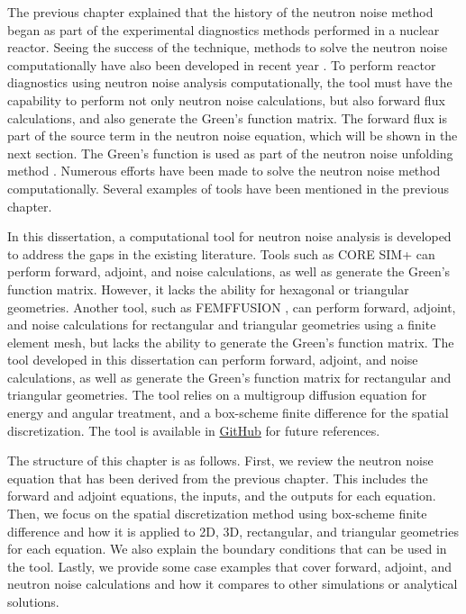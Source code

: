 \label{ch:simulations}

The previous chapter explained that the history of the neutron noise method began as part of the experimental diagnostics methods performed in a nuclear reactor. Seeing the success of the technique, methods to solve the neutron noise computationally have also been developed in recent year \cite{demaziereCORTEXProjectImproving2020}. To perform reactor diagnostics using neutron noise analysis computationally, the tool must have the capability to perform not only neutron noise calculations, but also forward flux calculations, and also generate the Green’s function matrix. The forward flux is part of the source term in the neutron noise equation, which will be shown in the next section. The Green’s function is used as part of the neutron noise unfolding method \cite{demaziereIdentificationLocalizationAbsorbers2005}. Numerous efforts have been made to solve the neutron noise method computationally. Several examples of tools have been mentioned in the previous chapter. 

In this dissertation, a computational tool for neutron noise analysis is developed to address the gaps in the existing literature. Tools such as CORE SIM+ \cite{mylonakisCORESIMFlexible2021} can perform forward, adjoint, and noise calculations, as well as generate the Green’s function matrix. However, it lacks the ability for hexagonal or triangular geometries. Another tool, such as FEMFFUSION \cite{vidal-ferrandizFEMFFUSIONFiniteElement2023}, can perform forward, adjoint, and noise calculations for rectangular and triangular geometries using a finite element mesh, but lacks the ability to generate the Green’s function matrix. The tool developed in this dissertation can perform forward, adjoint, and noise calculations, as well as generate the Green’s function matrix for rectangular and triangular geometries. The tool relies on a multigroup diffusion equation for energy and angular treatment, and a box-scheme finite difference for the spatial discretization. The tool is available in \href{https://github.com/harunardi/FANGS-UNFOLD}{GitHub} for future references.

The structure of this chapter is as follows. First, we review the neutron noise equation that has been derived from the previous chapter. This includes the forward and adjoint equations, the inputs, and the outputs for each equation. Then, we focus on the spatial discretization method using box-scheme finite difference and how it is applied to 2D, 3D, rectangular, and triangular geometries for each equation. We also explain the boundary conditions that can be used in the tool. Lastly, we provide some case examples that cover forward, adjoint, and neutron noise calculations and how it compares to other simulations or analytical solutions.

